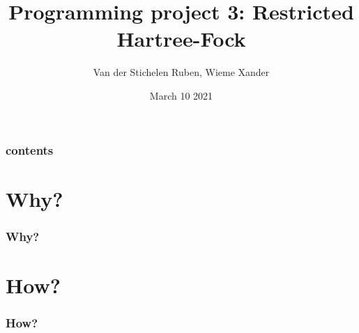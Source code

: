 \documentclass{beamer}
\title{Programming project 3: Restricted Hartree-Fock}
\author{Van der Stichelen Ruben, Wieme Xander}
\institute{Ghent University}
\date{March 10 2021}
\begin{document}
\begin{frame}
    \titlepage
\end{frame}

\begin{frame}
    \frametitle{contents}
    \tableofcontents
\end{frame}

\section{Why?}
\label{sec:why}
\begin{frame}
    \frametitle{Why?}

\end{frame}
\section{How?}
\label{sec:how}
\begin{frame}
    \frametitle{How?}
\end{frame}
\end{document}
